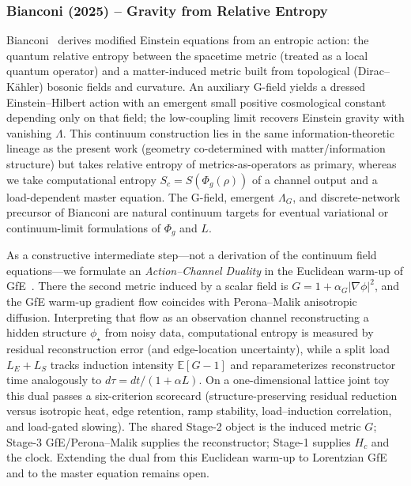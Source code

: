 \documentclass[reprint,amsmath,amssymb,aps,prd,preprintnumbers,superscriptaddress,longbibliography,10pt]{revtex4-2}
\begin{document}
\subsubsection{Bianconi (2025) -- Gravity from Relative Entropy}
Bianconi~\cite{Bianconi2025} derives modified Einstein equations from an entropic action: the quantum relative entropy between the spacetime metric (treated as a local quantum operator) and a matter-induced metric built from topological (Dirac--K\"ahler) bosonic fields and curvature. An auxiliary G-field yields a dressed Einstein--Hilbert action with an emergent small positive cosmological constant depending only on that field; the low-coupling limit recovers Einstein gravity with vanishing \(\Lambda\). This continuum construction lies in the same information-theoretic lineage as the present work (geometry co-determined with matter/information structure) but takes relative entropy of metrics-as-operators as primary, whereas we take computational entropy \(S_c = S(\Phi_g(\rho))\) of a channel output and a load-dependent master equation. The G-field, emergent \(\Lambda_G\), and discrete-network precursor of Bianconi are natural continuum targets for eventual variational or continuum-limit formulations of \(\Phi_g\) and \(L\).

As a constructive intermediate step---not a derivation of the continuum field equations---we formulate an \emph{Action--Channel Duality} in the Euclidean warm-up of GfE~\cite{Bianconi2025BeyondHolography}. There the second metric induced by a scalar field is \(G = 1 + \alpha_G |\nabla\phi|^2\), and the GfE warm-up gradient flow coincides with Perona--Malik anisotropic diffusion. Interpreting that flow as an observation channel reconstructing a hidden structure \(\phi_\star\) from noisy data, computational entropy is measured by residual reconstruction error (and edge-location uncertainty), while a split load \(L_E+L_S\) tracks induction intensity \(\mathbb{E}[G-1]\) and reparameterizes reconstructor time analogously to \(d\tau = dt/(1+\alpha L)\). On a one-dimensional lattice joint toy this dual passes a six-criterion scorecard (structure-preserving residual reduction versus isotropic heat, edge retention, ramp stability, load--induction correlation, and load-gated slowing). The shared Stage-2 object is the induced metric \(G\); Stage-3 GfE/Perona--Malik supplies the reconstructor; Stage-1 supplies \(H_c\) and the clock. Extending the dual from this Euclidean warm-up to Lorentzian GfE and to the master equation remains open.
\end{document}
